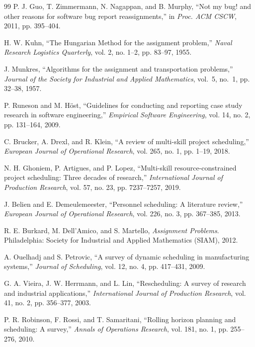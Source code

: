 \documentclass[journal]{IEEEtran}
\begin{document}
\begin{thebibliography}{99}
P. J. Guo, T. Zimmermann, N. Nagappan, and B. Murphy, ``Not my bug! and other reasons for software bug report reassignments,'' in \emph{Proc. ACM CSCW}, 2011, pp. 395–404.

H. W. Kuhn, ``The Hungarian Method for the assignment problem,'' \emph{Naval Research Logistics Quarterly}, vol. 2, no. 1–2, pp. 83–97, 1955.

J. Munkres, ``Algorithms for the assignment and transportation problems,'' 
\emph{Journal of the Society for Industrial and Applied Mathematics}, 
vol.~5, no.~1, pp. 32--38, 1957.

P. Runeson and M. Höst, ``Guidelines for conducting and reporting case study research in software engineering,'' \emph{Empirical Software Engineering}, vol. 14, no. 2, pp. 131--164, 2009.

C. Brucker, A. Drexl, and R. Klein, ``A review of multi-skill project scheduling,'' \emph{European Journal of Operational Research}, vol. 265, no. 1, pp. 1--19, 2018.

N. H. Ghoniem, P. Artigues, and P. Lopez, ``Multi-skill resource-constrained project scheduling: Three decades of research,'' \emph{International Journal of Production Research}, vol. 57, no. 23, pp. 7237--7257, 2019.

J. Belien and E. Demeulemeester, ``Personnel scheduling: A literature review,'' \emph{European Journal of Operational Research}, vol. 226, no. 3, pp. 367--385, 2013.

R. E. Burkard, M. Dell’Amico, and S. Martello, \emph{Assignment Problems}. Philadelphia: Society for Industrial and Applied Mathematics (SIAM), 2012.

A. Ouelhadj and S. Petrovic, ``A survey of dynamic scheduling in manufacturing systems,'' \emph{Journal of Scheduling}, vol. 12, no. 4, pp. 417--431, 2009.

G. A. Vieira, J. W. Herrmann, and L. Lin, ``Rescheduling: A survey of research and industrial applications,'' \emph{International Journal of Production Research}, vol. 41, no. 2, pp. 356--377, 2003.

P. R. Robinson, F. Rossi, and T. Samaritani, ``Rolling horizon planning and scheduling: A survey,'' \emph{Annals of Operations Research}, vol. 181, no. 1, pp. 255--276, 2010.


\end{thebibliography}
\end{document}
